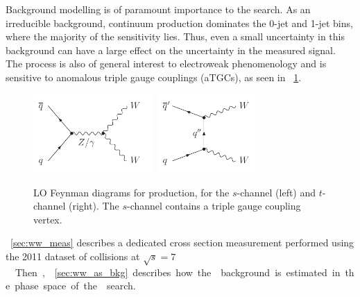
Background modelling is of paramount importance to the \HWW search. As an irreducible 
background, continuum \WWlvlv production dominates the 0-jet and 1-jet bins, where the 
majority of the sensitivity lies. Thus, even a small uncertainty in this background can 
have a large effect on the uncertainty in the measured signal. The process is also of general 
interest to electroweak phenomenology and is sensitive to anomalous triple gauge couplings 
(aTGCs), as seen in \Figure~\ref{fig:WW:feyn}.

\begin{figure}[b]
	\null\hfill
	\includegraphics[height=3cm]{axodraw/WW_schannel.pdf}
	\hfill
	\includegraphics[height=3cm]{axodraw/WW_tchannel.pdf}
	\hfill\null
	\caption{LO Feynman diagrams for \WW production, for the $s$-channel (left) and 
	$t$-channel (right). The $s$-channel contains a triple gauge coupling vertex.}
	\label{fig:WW:feyn}
\end{figure}

\Section~\ref{sec:ww_meas} describes a dedicated \WW cross section measurement performed 
using the 2011 dataset of \pp collisions at \unit{$\sqrt{s} = 7$}{\TeV}. Then, 
\Section~\ref{sec:ww_as_bkg} describes how the \WW background is estimated in the phase 
space of the \HWW search.

